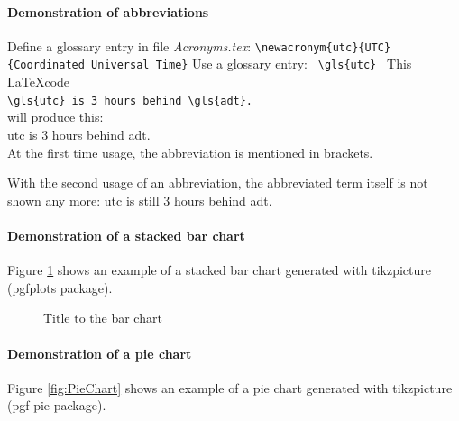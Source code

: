 \paragraph{Demonstration of abbreviations}
Define a glossary entry in file \textit{Acronyms.tex}:
\newline
\verb!\newacronym{utc}{UTC}{Coordinated Universal Time}!
\newline
Use a glossary entry: \verb! \gls{utc} !
\newline
This \LaTeX code \\

\verb*|\gls{utc} is 3 hours behind \gls{adt}.| \\

will produce this: \\

\gls{utc} is 3 hours behind \gls{adt}.\\

At the first time usage, the abbreviation is mentioned in brackets.

With the second usage of an abbreviation, the abbreviated term itself is not shown any more:
\gls{utc} is still 3 hours behind \gls{adt}.\\

\paragraph{Demonstration of a stacked bar chart}
Figure \ref{fig:StackedBarChart} shows an example of a stacked bar chart generated with tikzpicture (pgfplots package).

\begin{figure}
	\centering
	\caption{\label{fig:StackedBarChart}Title to the bar chart}
\end{figure}

\paragraph{Demonstration of a pie chart}
Figure \ref{fig:PieChart} shows an example of a pie chart generated with tikzpicture (pgf-pie package).

